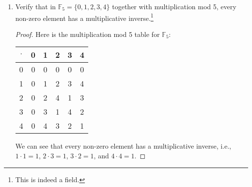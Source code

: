 \documentclass[10pt]{article}
\newcommand{\F}{\mathbb{F}}
\newcommand{\Q}{\mathbb{Q}}
\newenvironment{problem}[2][Problem]{\begin{trivlist}
\item[\hskip \labelsep {\bfseries #1}\hskip \labelsep {\bfseries #2.}]}{\end{trivlist}}
\begin{document}
\begin{problem}{4}
\begin{enumerate}
\begin{proof}
                Therefore, \( \Q(\sqrt{2}) \) is a field.


                
            \end{proof}
		\item Verify that in $ \F_5=\{0,1,2,3,4\} $ together with multiplication mod 5, every non-zero element has a multiplicative inverse.\footnote{This is indeed a field.}
                \begin{proof}
                    Here is the multiplication mod 5 table for \( \F_5 \):

                    \begin{center}
                        \begin{tabular}{c|c|c|c|c|c}
                            $ \cdot $ & 0 & 1 & 2 & 3 & 4 \\
                            \hline
                            0 & 0 & 0 & 0 & 0 & 0 \\
                            \hline
                            1 & 0 & 1 & 2 & 3 & 4 \\
                            \hline
                            2 & 0 & 2 & 4 & 1 & 3 \\
                            \hline
                            3 & 0 & 3 & 1 & 4 & 2 \\
                            \hline
                            4 & 0 & 4 & 3 & 2 & 1
                        \end{tabular}
                    \end{center}

                    We can see that every non-zero element has a multiplicative inverse, i.e., \( 1 \cdot 1 = 1 \), \( 2 \cdot 3 = 1 \), \( 3 \cdot 2 = 1 \), and \( 4 \cdot 4 = 1 \).
                \end{proof}

	\end{enumerate}
\end{problem}
\medskip
\end{document}
